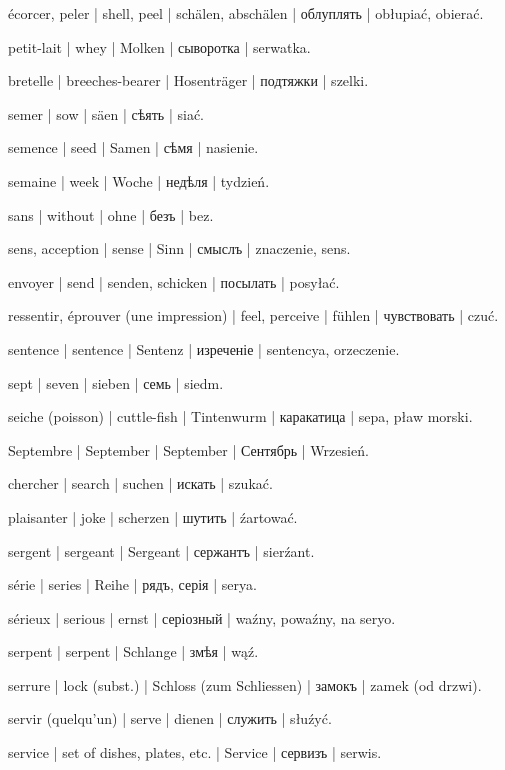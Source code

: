 \begin{outdent}{1em}
\uvsubentry{}
écorcer, peler | shell, peel | schälen, abschälen | облуплять | obłupiać, obierać.

petit-lait | whey | Molken | сыворотка | serwatka.

bretelle | breeches-bearer | Hosenträger | подтяжки | szelki.

semer | sow | säen | сѣять | siać.

\uvsubentry{}
semence | seed | Samen | сѣмя | nasienie.

semaine | week | Woche | недѣля | tydzień.

sans | without | ohne | безъ | bez.

sens, acception | sense | Sinn | смыслъ | znaczenie, sens.

envoyer | send | senden, schicken | посылать | posyłać.

ressentir, éprouver (une impression) | feel, perceive | fühlen | чувствовать | czuć.

sentence | sentence | Sentenz | изреченіе | sentencya, orzeczenie.

sept | seven | sieben | семь | siedm.

seiche (poisson) | cuttle-fish | Tintenwurm | каракатица | sepa, pław morski.

Septembre | September | September | Сентябрь | Wrzesień.

chercher | search | suchen | искать | szukać.

plaisanter | joke | scherzen | шутить | źartować.

sergent | sergeant | Sergeant | сержантъ | sierźant.

série | series | Reihe | рядъ, серія | serya.

sérieux | serious | ernst | серіозный | waźny, powaźny, na seryo.

serpent | serpent | Schlange | змѣя | wąź.

serrure | lock (subst.) | Schloss (zum Schliessen) | замокъ | zamek (od drzwi).

servir (quelqu’un) | serve | dienen | служить | słuźyć.

service | set of dishes, plates, etc. | Service | сервизъ | serwis.


\end{outdent}
